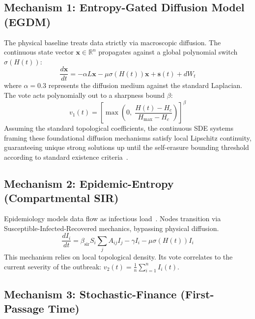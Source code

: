 \documentclass[conference]{IEEEtran}
\begin{document}
\subsection{Mechanism 1: Entropy-Gated Diffusion Model (EGDM)}

The physical baseline treats data strictly via macroscopic diffusion. The continuous
state vector $\mathbf{x} \in \mathbb{R}^n$ propagates against a global polynomial
switch $\sigma(H(t))$:
\begin{equation}
  \frac{d\mathbf{x}}{dt} = -\alpha L\mathbf{x} - \mu\sigma(H(t))\mathbf{x}
                           + \mathbf{s}(t) + dW_t
  \label{eq:egdm}
\end{equation}
where $\alpha = 0.3$ represents the diffusion medium against the standard Laplacian.
The vote acts polynomially out to a sharpness bound $\beta$:
\begin{equation}
  v_1(t) = \left[\max\!\left(0,\;\frac{H(t) - H_c}{H_{\max} - H_c}\right)\right]^{\!\beta}
  \label{eq:v1}
\end{equation}
Assuming the standard topological coefficients, the continuous SDE systems framing these
foundational diffusion mechanisms satisfy local Lipschitz continuity, guaranteeing unique
strong solutions up until the self-erasure bounding threshold according to standard
existence criteria~\cite{oksendal2003stochastic}.

\subsection{Mechanism 2: Epidemic-Entropy (Compartmental SIR)}

Epidemiology models data flow as infectious load~\cite{pastor2015epidemic}. Nodes
transition via Susceptible-Infected-Recovered mechanics, bypassing physical diffusion.
\begin{equation}
  \frac{dI_i}{dt} = \beta_{\mathrm{sir}} S_i \sum_j A_{ij} I_j
                   - \gamma I_i - \mu\sigma(H(t))I_i
  \label{eq:sir}
\end{equation}
This mechanism relies on local topological density. Its vote correlates to the current
severity of the outbreak: $v_2(t) = \tfrac{1}{n}\sum_{i=1}^n I_i(t)$.

\subsection{Mechanism 3: Stochastic-Finance (First-Passage Time)}
\end{document}
